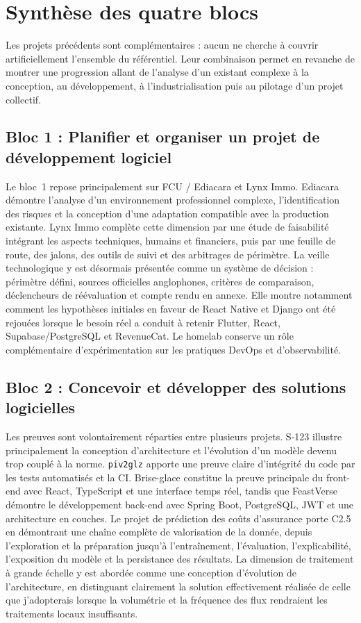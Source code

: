 \section{Synthèse des quatre blocs}

Les projets précédents sont complémentaires : aucun ne cherche à couvrir artificiellement l'ensemble du référentiel. Leur combinaison permet en revanche de montrer une progression allant de l'analyse d'un existant complexe à la conception, au développement, à l'industrialisation puis au pilotage d'un projet collectif.

\subsection*{Bloc 1 : Planifier et organiser un projet de développement logiciel}

Le bloc~1 repose principalement sur FCU / Ediacara et Lynx Immo. Ediacara démontre l'analyse d'un environnement professionnel complexe, l'identification des risques et la conception d'une adaptation compatible avec la production existante. Lynx Immo complète cette dimension par une étude de faisabilité intégrant les aspects techniques, humains et financiers, puis par une feuille de route, des jalons, des outils de suivi et des arbitrages de périmètre. La veille technologique y est désormais présentée comme un système de décision : périmètre défini, sources officielles anglophones, critères de comparaison, déclencheurs de réévaluation et compte rendu en annexe. Elle montre notamment comment les hypothèses initiales en faveur de React Native et Django ont été rejouées lorsque le besoin réel a conduit à retenir Flutter, React, Supabase/PostgreSQL et RevenueCat. Le homelab conserve un rôle complémentaire d'expérimentation sur les pratiques DevOps et d'observabilité.

\subsection*{Bloc 2 : Concevoir et développer des solutions logicielles}

Les preuves sont volontairement réparties entre plusieurs projets. S-123 illustre principalement la conception d'architecture et l'évolution d'un modèle devenu trop couplé à la norme. \texttt{piv2glz} apporte une preuve claire d'intégrité du code par les tests automatisés et la CI. Brise-glace constitue la preuve principale du front-end avec React, TypeScript et une interface temps réel, tandis que FeastVerse démontre le développement back-end avec Spring Boot, PostgreSQL, JWT et une architecture en couches. Le projet de prédiction des coûts d'assurance porte C2.5 en démontrant une chaîne complète de valorisation de la donnée, depuis l'exploration et la préparation jusqu'à l'entraînement, l'évaluation, l'explicabilité, l'exposition du modèle et la persistance des résultats. La dimension de traitement à grande échelle y est abordée comme une conception d'évolution de l'architecture, en distinguant clairement la solution effectivement réalisée de celle que j'adopterais lorsque la volumétrie et la fréquence des flux rendraient les traitements locaux insuffisants.

